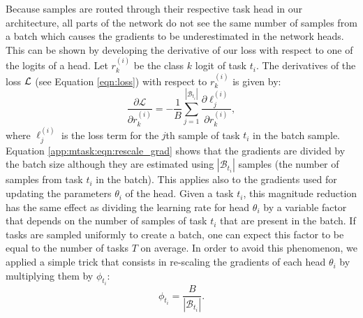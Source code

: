 Because samples are routed through their respective task head in our architecture, all parts of the network do not see the same number of samples from a batch which causes the gradients to be underestimated in the network heads. This can be shown by developing the derivative of our loss with respect to one of the logits of a head. Let $r^{(i)}_{k}$ be the class $k$ logit of task $t_i$. The derivatives of the loss ${\cal L}$ (see Equation \ref{eqn:loss}) with respect to $r^{(i)}_k$ is given by:
\begin{equation} 
    \label{app:mtask:eqn:rescale_grad}
    \frac{\partial \mathcal{L}}{\partial r^{(i)}_{k}} = - \frac{1}{B} \sum_{j=1}^{\left|\mathcal{B}_{t_i}\right|} \frac{\partial \ell^{(i)}_j}{\partial r^{(i)}_{k}},
\end{equation}
where $\ell^{(i)}_j$ is the loss term for the $j$th sample of task $t_i$ in the batch sample. Equation \ref{app:mtask:eqn:rescale_grad} shows that the gradients are divided by the batch size although they are estimated using $\left|\mathcal{B}_{t_i}\right|$ samples (\ie the number of samples from task $t_i$ in the batch). This applies also to the gradients used for updating the parameters $\theta_i$ of the head. Given a task $t_i$, this magnitude reduction has the same effect as dividing the learning rate for head $\theta_i$ by a variable factor that depends on the number of samples of task $t_i$ that are present in the batch. If tasks are sampled uniformly to create a batch, one can expect this factor to be equal to the number of tasks $T$ on average. In order to avoid this phenomenon, we applied a simple trick that consists in re-scaling the gradients of each head $\theta_i$ by multiplying them by $\phi_{t_i}$:
\begin{equation}
\phi_{t_i} = \frac{B}{\left|\mathcal{B}_{t_i}\right|}.
\end{equation}




